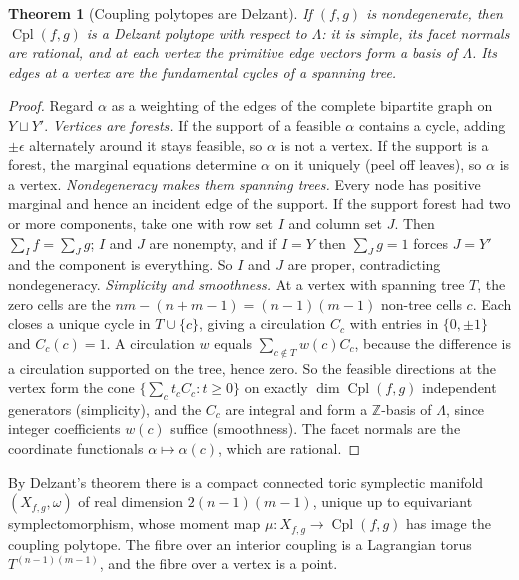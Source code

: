 \documentclass[11pt]{article}
\newtheorem{theorem}{Theorem}[section]
\theoremstyle{definition}
\theoremstyle{remark}
\newcommand{\Cpl}{\operatorname{Cpl}}
\begin{document}
\begin{theorem}[Coupling polytopes are Delzant]\label{thm:delzant}
If $(f,g)$ is nondegenerate, then $\Cpl(f,g)$ is a Delzant polytope with respect to $\Lambda$: it is
simple, its facet normals are rational, and at each vertex the primitive edge vectors form a basis of
$\Lambda$. Its edges at a vertex are the fundamental cycles of a spanning tree.
\end{theorem}
\begin{proof}
Regard $\alpha$ as a weighting of the edges of the complete bipartite graph on $Y\sqcup Y'$.
\emph{Vertices are forests.} If the support of a feasible $\alpha$ contains a cycle, adding $\pm\epsilon$
alternately around it stays feasible, so $\alpha$ is not a vertex. If the support is a forest, the
marginal equations determine $\alpha$ on it uniquely (peel off leaves), so $\alpha$ is a vertex.
\emph{Nondegeneracy makes them spanning trees.} Every node has positive marginal and hence an incident
edge of the support. If the support forest had two or more components, take one with row set $I$ and
column set $J$. Then $\sum_If=\sum_Jg$; $I$ and $J$ are nonempty, and if $I=Y$ then $\sum_Jg=1$ forces
$J=Y'$ and the component is everything. So $I$ and $J$ are proper, contradicting nondegeneracy.
\emph{Simplicity and smoothness.} At a vertex with spanning tree $T$, the zero cells are the
$nm-(n+m-1)=(n-1)(m-1)$ non-tree cells $c$. Each closes a unique cycle in $T\cup\{c\}$, giving a
circulation $C_c$ with entries in $\{0,\pm1\}$ and $C_c(c)=1$. A circulation $w$ equals
$\sum_{c\notin T}w(c)C_c$, because the difference is a circulation supported on the tree, hence zero.
So the feasible directions at the vertex form the cone $\{\sum_ct_cC_c:t\ge0\}$ on exactly
$\dim\Cpl(f,g)$ independent generators (simplicity), and the $C_c$ are integral and form a $\mathbb{Z}$-basis
of $\Lambda$, since integer coefficients $w(c)$ suffice (smoothness). The facet normals are the coordinate
functionals $\alpha\mapsto\alpha(c)$, which are rational.
\end{proof}

By Delzant's theorem \cite{Delzant1988} there is a compact connected toric symplectic manifold
$(X_{f,g},\omega)$ of real dimension $2(n-1)(m-1)$, unique up to equivariant symplectomorphism, whose
moment map $\mu\colon X_{f,g}\to\Cpl(f,g)$ has image the coupling polytope. The fibre over an interior
coupling is a Lagrangian torus $T^{(n-1)(m-1)}$, and the fibre over a vertex is a point.
\end{document}
